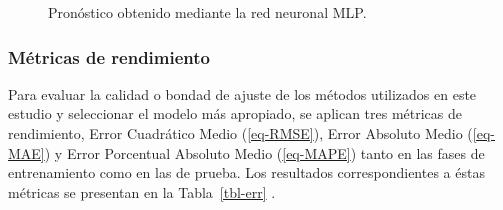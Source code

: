 \documentclass[
  us-letterpaper,
]{scrreprt}
\theoremstyle{plain}
\theoremstyle{definition}
\theoremstyle{definition}
\theoremstyle{plain}
\theoremstyle{remark}
\begin{document}
\begin{figure}


\caption{\label{fig-pmlp}Pronóstico obtenido mediante la red neuronal
MLP.}

\end{figure}%

\subsubsection{Métricas de
rendimiento}\label{muxe9tricas-de-rendimiento}

Para evaluar la calidad o bondad de ajuste de los métodos utilizados en
este estudio y seleccionar el modelo más apropiado, se aplican tres
métricas de rendimiento, Error Cuadrático Medio (\ref{eq-RMSE}), Error
Absoluto Medio (\ref{eq-MAE}) y Error Porcentual Absoluto Medio
(\ref{eq-MAPE}) tanto en las fases de entrenamiento como en las de
prueba. Los resultados correspondientes a éstas métricas se presentan en
la Tabla~\ref{tbl-err} .
\end{document}

